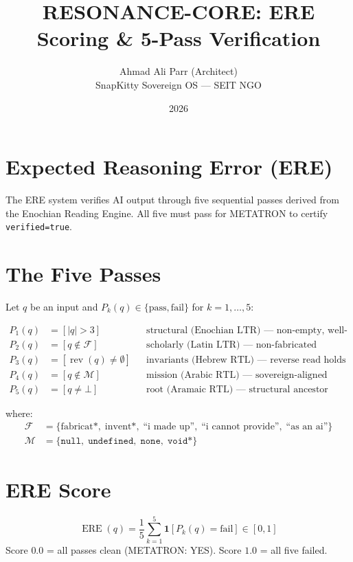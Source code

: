 \documentclass{article}
\title{RESONANCE-CORE: ERE Scoring \& 5-Pass Verification}
\author{Ahmad Ali Parr (Architect) \\ SnapKitty Sovereign OS --- SEIT NGO}
\date{2026}
\begin{document}
\maketitle

\section{Expected Reasoning Error (ERE)}
The ERE system verifies AI output through five sequential passes derived from the Enochian Reading Engine. All five must pass for METATRON to certify \texttt{verified=true}.

\section{The Five Passes}
Let $q$ be an input and $P_k(q) \in \{\text{pass}, \text{fail}\}$ for $k = 1, \ldots, 5$:

\begin{align}
  P_1(q) &= [|q| > 3] && \text{structural (Enochian LTR) --- non-empty, well-formed} \\
  P_2(q) &= [q \notin \mathcal{F}] && \text{scholarly (Latin LTR) --- non-fabricated} \\
  P_3(q) &= [\operatorname{rev}(q) \neq \emptyset] && \text{invariants (Hebrew RTL) --- reverse read holds} \\
  P_4(q) &= [q \notin \mathcal{M}] && \text{mission (Arabic RTL) --- sovereign-aligned} \\
  P_5(q) &= [q \neq \bot] && \text{root (Aramaic RTL) --- structural ancestor valid}
\end{align}

where:
\begin{align}
  \mathcal{F} &= \{\text{fabricat*},\; \text{invent*},\; \text{``i made up''},\; \text{``i cannot provide''},\; \text{``as an ai''}\} \\
  \mathcal{M} &= \{\texttt{null},\; \texttt{undefined},\; \texttt{none},\; \texttt{void*}\}
\end{align}

\section{ERE Score}
\begin{equation}
  \operatorname{ERE}(q) = \frac{1}{5} \sum_{k=1}^{5} \mathbf{1}[P_k(q) = \text{fail}] \in [0, 1]
\end{equation}
Score $0.0$ = all passes clean (METATRON: YES). Score $1.0$ = all five failed.
\end{document}
